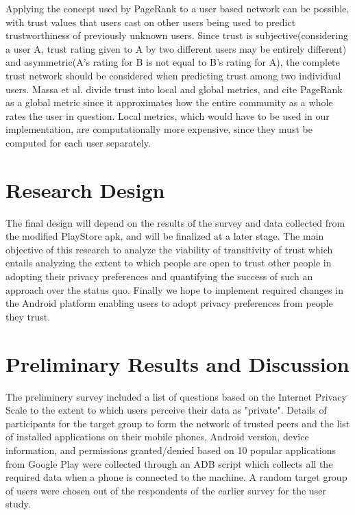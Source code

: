 Applying the concept used by PageRank to a user based network can be possible, with trust values that users cast on other users being used to predict trustworthiness of previously unknown users. Since trust is subjective(considering a user A, trust rating given to A by two different users may be entirely different) and asymmetric(A's rating for B is not equal to B's rating for A), the complete trust network should be considered when predicting trust among two individual users. Massa et al. divide trust into local and global metrics, and cite PageRank as a global metric since it approximates how the entire community as a whole rates the user in question\cite{massa2004trust}. Local metrics, which would have to be used in our implementation, are computationally more expensive, since they must be computed for each user separately. 
\smallskip

\section{Research Design}
The final design will depend on the results of the survey and data collected from the modified PlayStore apk, and will be finalized at a later stage. The main objective of this research to analyze the viability of transitivity of trust which entails analyzing the extent to which people are open to trust other people in adopting their privacy preferences and quantifying the success of such an approach over the status quo. Finally we hope to implement required changes in the Android platform enabling users to adopt privacy preferences from people they trust.
\smallskip

\section{Preliminary Results and Discussion}
The preliminery survey included a list of questions based on the Internet Privacy Scale\cite{buchanan2007development} to the extent to which users perceive their data as "private". Details of participants for the target group to form the network of trusted peers and the list of installed applications on their mobile phones, Android version, device information, and permissions granted/denied based on 10 popular applications from Google Play were collected through an ADB script which collects all the required data when a phone is connected to the machine. A random target group of users were chosen out of the respondents of the earlier survey for the user study. 
\smallskip

